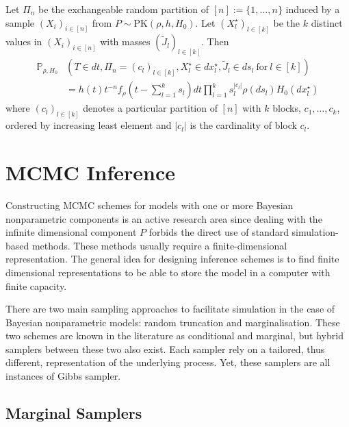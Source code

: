 \begin{proposition} \label{prop:perman2}
Let $\Pi_n$ be the exchangeable random partition of $[n] := \{1, \dots, n\}$ induced by a sample $(X_i)_{i \in [n]}$ from $P \sim \text{PK}(\rho,h,H_0)$. Let $(X_l^\star)_{l \in [k]}$ be the $k$ distinct values in $(X_i)_{i \in [n]}$ with masses $(\tilde{J}_l)_{l \in [k]}$. Then
\begin{equation} \label{eq:perman2}
\begin{aligned}
\mathbb{P}_{\rho, H_0}&(T \in dt, \Pi_n = (c_l)_{l \in [k]}, X_l^\star \in dx_l^\star, \tilde{J}_l \in ds_l\ \text{for} \ l \in [k]) \\
&= h(t) t^{-n} f_\rho(t - \sum_{l=1}^k{s_l})dt \prod_{l=1}^k{s_l^{|c_l|} \rho(ds_l)H_0(dx_l^\star)}
\end{aligned}
\end{equation}
where $(c_l)_{l \in [k]}$ denotes a particular partition of $[n]$ with $k$ blocks, $c_1,\dots , c_k$, ordered by increasing least element and $|c_l|$ is the cardinality of block $c_l$.
\end{proposition}

\section{MCMC Inference}
Constructing \gls{MCMC} schemes for models with one or more Bayesian nonparametric components is an active research area since dealing with the infinite dimensional component $P$ forbids the direct use of standard simulation-based methods. These methods usually require a finite-dimensional representation. The general idea for designing inference schemes is to find finite dimensional representations to be able to store the model in a computer with finite capacity.

There are two main sampling approaches to facilitate simulation in the case of Bayesian nonparametric models: random truncation and marginalisation. These two schemes are known in the literature as conditional and marginal, but hybrid samplers between these two also exist. Each sampler rely on a tailored, thus different, representation of the underlying process. Yet, these samplers are all instances of Gibbs sampler.

\subsection{Marginal Samplers}

